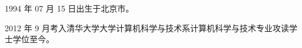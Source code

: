 \begin{resume}


  1994 年 07 月 15 日出生于北京市。

  2012 年 9 月考入清华大学大学计算机科学与技术系计算机科学与技术专业攻读学士学位至今。

\end{resume}
